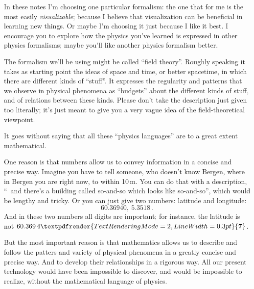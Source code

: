 \documentclass[a4paper,12pt,%
onecolumn,oneside,titlepage,%
british%
]{memoir}
\renewcommand*{\bm}[1]{\textpdfrender{TextRenderingMode=2,LineWidth=0.3pt}{\boldsymbol{#1}}}
\renewcommand*{\|}[1][]{\nonscript\:#1\vert\nonscript\:\mathopen{}}
\begin{document}
In these notes I'm choosing one particular formalism: the one that for me is the most easily \emph{visualizable}; because I believe that visualization can be beneficial in learning new things. Or maybe I'm choosing it just because I like it best. I encourage you to explore how the physics you've learned is expressed in other physics formalisms; maybe you'll like another physics formalism better.

The formalism we'll be using might be called \enquote{field theory}. Roughly speaking it takes as starting point the ideas of space and time, or better spacetime, in which there are different kinds of \enquote{stuff}. It expresses the regularity and patterns that we observe in physical phenomena as \enquote{budgets} about the different kinds of stuff, and of relations between these kinds. Please don't take the description just given too literally; it's just meant to give you a very vague idea of the field-theoretical viewpoint.

\medskip

It goes without saying that all these \enquote{physics languages} are to a great extent mathematical.

One reason is that numbers allow us to convey information in a concise and precise way. Imagine you have to tell someone, who doesn't know
Bergen, where in Bergen you are right now, to within 10\,m. You can do that with a description, \enquote{\textellipsis\ and there's a building called so-and-so which looks like so-and-so\textellipsis}, which would be lengthy and tricky. Or you can just give two numbers: latitude and longitude:
\begin{equation*}
  \num{60.36940},\ \num{5.3518} \ .
\end{equation*}
And in these two numbers all digits are important; for instance, the latitude is not \ensuremath{60.369\,4\bm{7}}.

But the most important reason is that mathematics allows us to describe and follow the patters and variety of physical phenomena in a greatly concise and precise way. And to develop their relationships in a rigorous way.
All our present technology would have been impossible to discover, and would be impossible to realize, without the mathematical language of physics.
\end{document}
